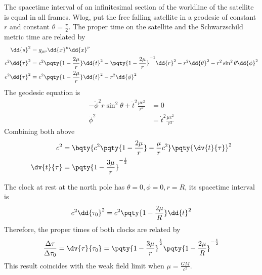 \documentclass[12pt]{article}
\begin{document}
        \subsubsection{}
        The spacetime interval of an infinitesimal section of the worldline of the satellite is equal in all frames. Wlog, put the free falling satellite in a geodesic of constant \(r\) and constant \(\theta = \frac{\pi}{2}\). The proper time on the satellite and the Schwarzschild metric time are related by \begin{align*}
            \dd{s}^2 &=  g_{\mu\nu} \dd{x}^\mu \dd{x}^\nu\\
            c^2 \dd{\tau}^2 &= c^2 \pqty{1- \frac{2\mu}{r} } \dd{t}^2 - \pqty{1- \frac{2\mu}{r} }^{-1} \dd{r}^2 - r^2 \dd{\theta}^2 - r^2\sin^2\theta \dd{\phi}^2\\
            c^2 \dd{\tau}^2 &= c^2 \pqty{1- \frac{2\mu}{r} } \dd{t}^2 - r^2 \dd{\phi}^2
        \end{align*}
        The geodesic equation is \begin{align*}
            -\dot{\phi}^2 r \sin^2\theta + \dot{t}^2 \frac{\mu c^2}{r^2} &= 0\\
            \dot{\phi}^2 &= \dot{t}^2 \frac{\mu c^2}{r^3 }
        \end{align*}
        Combining both above \begin{align*}
            c^2 &= \bqty{c^2\pqty{1 - \frac{2\mu}{r}} - \frac{\mu}{r} c^2} \pqty{\dv{t}{\tau}}^2\\
            \dv{t}{\tau} &= \pqty{1 - \frac{3\mu}{r}}^{ -\frac{1}{2}}
        \end{align*}
        
        The clock at rest at the north pole has \(\theta = 0,\phi = 0, r = R\), its spacetime interval is \[
            c^2 \dd{\tau_0}^2 = c^2 \pqty{1 - \frac{2\mu}{R}} \dd{t}^2
        \]
        Therefore, the proper times of both clocks are related by \[
            \frac{\Delta \tau} {\Delta  \tau_0} = \dv{\tau}{\tau_0} = \pqty{1 - \frac{3\mu}{r}}^\frac{1}{2} \pqty{1 - \frac{2\mu}{R}}^{ - \frac{1}{2}}
        \]
        This result coincides with the weak field limit when \(\mu = \frac{GM}{c^2}\).
\end{document}
